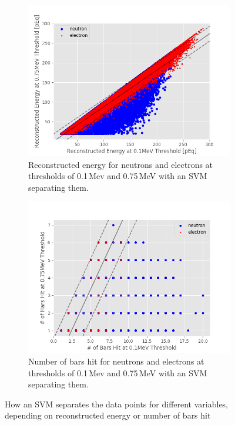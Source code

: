 \documentclass[12pt,a4paper]{article}
\begin{document}
\begin{figure}[H]
\centering
\begin{subfigure}{.5\textwidth}
  \centering
  \includegraphics[width=\linewidth]{recon_0_1_vs_recon_0_75.png}
  \captionsetup{width=.9\linewidth}
  \caption{Reconstructed energy for neutrons and electrons at thresholds of 0.1\,Mev and 0.75\,MeV with an SVM separating them.}
  \label{sub_SVM_examples_recon}
\end{subfigure}%
\begin{subfigure}{.5\textwidth}
  \centering
  \includegraphics[width=\linewidth]{bars_0_1_vs_bars_0_75.png}
  \captionsetup{width=.9\linewidth}
  \caption{Number of bars hit for neutrons and electrons at thresholds of 0.1\,Mev and 0.75\,MeV with an SVM separating them.}
  \label{sub_SVM_examples_bars}
\end{subfigure}
\caption{How an SVM separates the data points for different variables, depending on reconstructed energy or number of bars hit}
\label{SVM_examples}
\end{figure}
\end{document}
